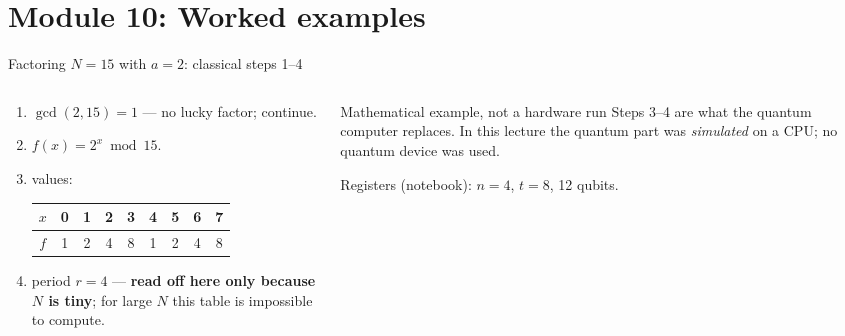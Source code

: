 \documentclass[aspectratio=169,11pt]{beamer}
\newcommand{\hl}[1]{{\color{qorange}\textbf{#1}}}
\begin{document}
\section{Module 10: Worked examples}
\begin{frame}[label=fEx15a]{Factoring $N = 15$ with $a = 2$: classical steps 1--4}
  \begin{columns}[T]
    \begin{column}{0.5\textwidth}
      \small
      \begin{enumerate}\itemsep2pt
        \item $\gcd(2, 15) = 1$ --- no lucky factor; continue.
        \item $f(x) = 2^x \bmod 15$.
        \item values:\\[2pt]
          {\scriptsize\begin{tabular}{c|cccccccc}
            $x$ & 0 & 1 & 2 & 3 & 4 & 5 & 6 & 7\\ \hline
            $f$ & 1 & 2 & 4 & 8 & 1 & 2 & 4 & 8
          \end{tabular}}
        \item period $r = 4$ --- \hl{read off here only because $N$ is tiny}; for large $N$ this table is impossible to compute.
      \end{enumerate}
    \end{column}
    \begin{column}{0.46\textwidth}
      \begin{alertblock}{Mathematical example, not a hardware run}
        \small Steps 3--4 are what the quantum computer replaces. In this lecture the quantum part was \emph{simulated} on a CPU; no quantum device was used.
      \end{alertblock}
      \scriptsize Registers (notebook): $n = 4$, $t = 8$, 12 qubits.
    \end{column}
  \end{columns}
\end{frame}
\end{document}
